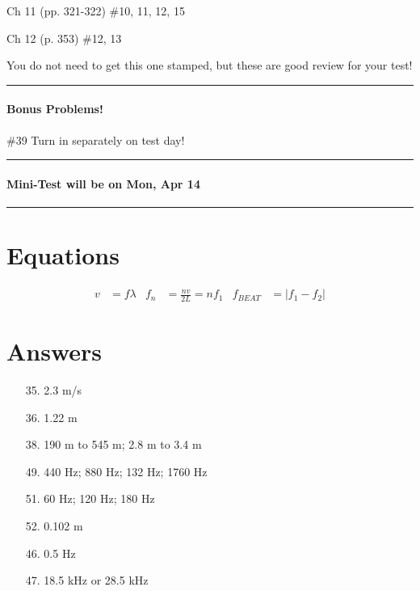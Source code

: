 \documentclass[10pt]{exam}
\begin{document}
Ch 11 (pp. 321-322) \#10, 11, 12, 15

Ch 12 (p. 353) \#12, 13
   
{\sc You do not need to get this one stamped,
but these are good review for your test!}

\vspace{0.5em}
\hrule


\paragraph{Bonus Problems!} \#39
\dotfill Turn in separately on test day!

\vspace{0.5em}
\hrule


\paragraph{Mini-Test will be on Mon, Apr 14} \hfill

\vspace{0.5em}

\hrule


\section*{Equations}

\begin{align*}
  v &= f \lambda &
  f_n &= \frac{nv}{2L} = nf_1 &
  f_{BEAT} &= \left|f_1-f_2\right| %
\end{align*}



\pagebreak

\section*{Answers}

\begin{multicols}{2}

  \begin{itemize}[noitemsep]
    \item[35.]  2.3 m/s
    \item[36.]  1.22 m
    \item[38.]  190 m to 545 m; 
                2.8 m to 3.4 m
    \item[49.]  440 Hz; 880 Hz; 
                132 Hz; 1760 Hz
    \item[51.]  60 Hz; 120 Hz; 180 Hz
    \item[52.]  0.102 m
    \item[46.]  0.5 Hz
    \item[47.]  18.5 kHz or 28.5 kHz
    
  \end{itemize}
  
\end{multicols}
\end{document}
